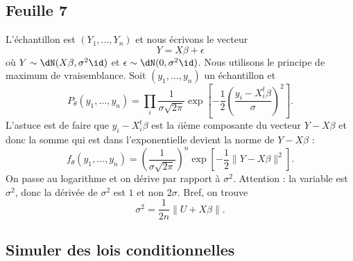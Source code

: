 \subsection{Feuille 7}

L'échantillon est \( (Y_1,\ldots, Y_n) \) et nous écrivons le vecteur
\begin{equation}
	Y=X\beta+\epsilon
\end{equation}
où \( Y\sim\dN(X\beta,\sigma^2\id)\) et \( \epsilon\sim\dN(0,\sigma^2\id)\). Nous utilisons le principe de maximum de vraisemblance. Soit \( (y_1,\ldots, y_n)\) un échantillon et
\begin{equation}
	P_{\theta}(y_1,\ldots, y_n)=\prod_i\frac{1}{ \sigma\sqrt{2\pi }}\exp\left[ -\frac{ 1 }{2}\left( \frac{ y_i-X_i^t\beta }{ \sigma } \right)^2 \right].
\end{equation}
L'astuce est de faire que \( y_i-X_i^t\beta\) est la \( i\)ième composante du vecteur \( Y-X\beta\) et donc la somme qui est dans l'exponentielle devient la norme de \( Y-X\beta\) :
\begin{equation}
	f_{\theta}(y_1,\ldots, y_n)=\left( \frac{1}{ \sigma\sqrt{2\pi} } \right)^n\exp\left[ -\frac{ 1 }{2}\| Y-X\beta \|^2 \right].
\end{equation}
On passe au logarithme et on dérive par rapport à \( \sigma^2\). Attention : la variable est \( \sigma^2\), donc la dérivée de \( \sigma^2\) est \( 1\) et non \( 2\sigma\). Bref, on trouve
\begin{equation}
	\sigma^2=\frac{1}{ 2n }\| U+X\beta \|.
\end{equation}

\subsection{Simuler des lois conditionnelles}

